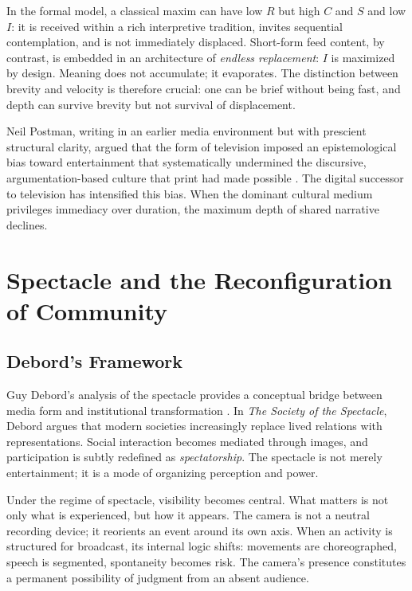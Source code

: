 \documentclass[12pt]{article}
\theoremstyle{definition}
\theoremstyle{plain}
\begin{document}
In the formal model, a classical maxim can have low $R$ but high $C$ and $S$ and low $I$: it is received within a rich interpretive tradition, invites sequential contemplation, and is not immediately displaced. Short-form feed content, by contrast, is embedded in an architecture of \emph{endless replacement}: $I$ is maximized by design. Meaning does not accumulate; it evaporates. The distinction between brevity and velocity is therefore crucial: one can be brief without being fast, and depth can survive brevity but not survival of displacement.

Neil Postman, writing in an earlier media environment but with prescient structural clarity, argued that the form of television imposed an epistemological bias toward entertainment that systematically undermined the discursive, argumentation-based culture that print had made possible \citep{Postman1985}. The digital successor to television has intensified this bias. When the dominant cultural medium privileges immediacy over duration, the maximum depth of shared narrative declines.

\section{Spectacle and the Reconfiguration of Community}
\label{sec:spectacle}

\subsection{Debord's Framework}

Guy Debord's analysis of the spectacle provides a conceptual bridge between media form and institutional transformation \citep{Debord1994}. In \emph{The Society of the Spectacle}, Debord argues that modern societies increasingly replace lived relations with representations. Social interaction becomes mediated through images, and participation is subtly redefined as \emph{spectatorship}. The spectacle is not merely entertainment; it is a mode of organizing perception and power.

Under the regime of spectacle, visibility becomes central. What matters is not only what is experienced, but how it appears. The camera is not a neutral recording device; it reorients an event around its own axis. When an activity is structured for broadcast, its internal logic shifts: movements are choreographed, speech is segmented, spontaneity becomes risk. The camera's presence constitutes a permanent possibility of judgment from an absent audience.
\end{document}
